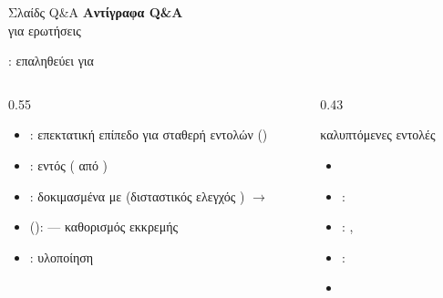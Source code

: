 
\begin{frame}{Σλαίδς Q\&A}
  \centering\Large
  \vfill
  \textbf{Αντίγραφα Q\&A} \\ \vspace{0.5em}
    για ερωτήσεις
  \vfill
\end{frame}

\begin{frame}{:  επαληθεύει  για }
  \begin{columns}[T]
    \begin{column}{0.55\textwidth}
      \begin{itemize}
        \item {}: επεκτατική επίπεδο  για σταθερή  εντολών ()
        \item {}: εντός  ( από )
        \item {}: δοκιμασμένα με  (δισταστικός ελεγχός )
              $\to$ 
        \item {} (\vclmul):  —  καθορισμός εκκρεμής
        \item {} \Decaps:  υλοποίηση
      \end{itemize}
    \end{column}
    \begin{column}{0.43\textwidth}
      \begin{block}{ καλυπτόμενες εντολές}
        \begin{itemize}\footnotesize
          \item {}
          \item {}: 
          \item {}: \clmul, \clmulh
          \item {}: 
          \item {}
        \end{itemize}
      \end{block}
    \end{column}
  \end{columns}
\end{frame}

